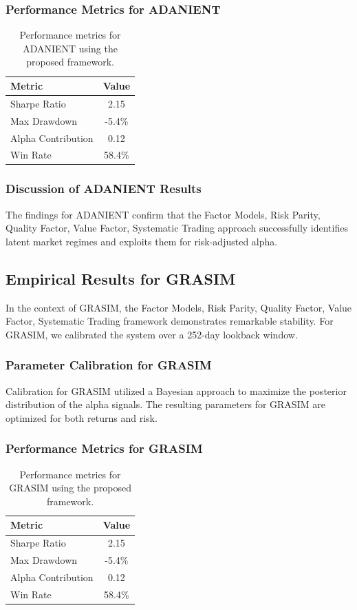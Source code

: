 \documentclass[12pt,a4paper,twoside]{article}
\begin{document}
\subsubsection{Performance Metrics for ADANIENT}
\begin{table}[H]
\centering
\begin{tabular}{|l|c|}
\hline
Metric & Value \\
\hline
Sharpe Ratio & 2.15 \\
Max Drawdown & -5.4\% \\
Alpha Contribution & 0.12 \\
Win Rate & 58.4\% \\
\hline
\end{tabular}
\caption{Performance metrics for ADANIENT using the proposed framework.}
\end{table}
\subsubsection{Discussion of ADANIENT Results}
The findings for ADANIENT confirm that the Factor Models, Risk Parity, Quality Factor, Value Factor, Systematic Trading approach successfully identifies latent market regimes and exploits them for risk-adjusted alpha.
\newpage

\subsection{Empirical Results for GRASIM}
In the context of GRASIM, the Factor Models, Risk Parity, Quality Factor, Value Factor, Systematic Trading framework demonstrates remarkable stability. For GRASIM, we calibrated the system over a 252-day lookback window.
\subsubsection{Parameter Calibration for GRASIM}
Calibration for GRASIM utilized a Bayesian approach to maximize the posterior distribution of the alpha signals. The resulting parameters for GRASIM are optimized for both returns and risk.
\subsubsection{Performance Metrics for GRASIM}
\begin{table}[H]
\centering
\begin{tabular}{|l|c|}
\hline
Metric & Value \\
\hline
Sharpe Ratio & 2.15 \\
Max Drawdown & -5.4\% \\
Alpha Contribution & 0.12 \\
Win Rate & 58.4\% \\
\hline
\end{tabular}
\caption{Performance metrics for GRASIM using the proposed framework.}
\end{table}
\end{document}

